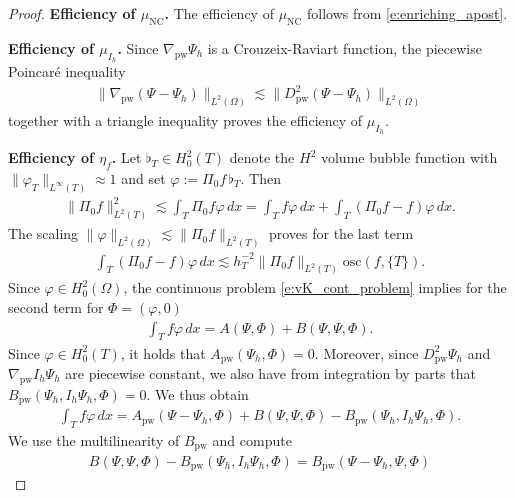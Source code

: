 \documentclass[a4paper]{amsart}
\theoremstyle{definition}
\numberwithin{equation}{section}
\numberwithin{theorem}{section}
\newcommand{\pw}{\mathrm{pw}}
\newcommand{\nc}{\mathrm{NC}}
\newcommand{\osc}{\mathrm{osc}}
\begin{document}
    
\begin{proof}
    \textbf{Efficiency of $\mu_\nc$.}
    The efficiency of $\mu_\nc$ follows from \eqref{e:enriching_apost}.
    
    \textbf{Efficiency of $\mu_{I_h}$.}
    Since $\nabla_\pw\Psi_h$ is a Crouzeix-Raviart function,
    the piecewise Poincar\'e inequality \cite{Brenner2003}
    \begin{align*}
        \lVert \nabla_\pw(\Psi-\Psi_h)\rVert_{L^2(\Omega)}
        \lesssim \lVert D^2_\pw(\Psi-\Psi_h)\rVert_{L^2(\Omega)}
    \end{align*}
    together with a triangle inequality proves the efficiency 
    of $\mu_{I_h}$.
    
    \textbf{Efficiency of $\eta_f$.}
    Let $\flat_T\in H^2_0(T)$ denote the $H^2$ volume bubble function
    with $\|\varphi_T\|_{L^\infty(T)}\approx1$
    and set $\varphi:=\Pi_0 f \,\flat_T$.
    Then 
    \begin{align*}
        \lVert \Pi_0 f\rVert_{L^2(T)}^2
        \lesssim \int_T \Pi_0 f \varphi\,dx 
        = \int_T f \varphi\,dx + \int_T (\Pi_0 f - f) \varphi\,dx.
    \end{align*}
    The scaling $\lVert\varphi\rVert_{L^2(\Omega)}\lesssim \lVert\Pi_0 f\rVert_{L^2(T)}$
    proves for the last term 
    \begin{align*}
        \int_T (\Pi_0 f - f) \varphi\,dx \lesssim h_T^{-2}  \lVert\Pi_0 f\rVert_{L^2(T)} \osc(f,\{T\}).
    \end{align*}
    Since $\varphi\in H^2_0(\Omega)$, the continuous problem
    \eqref{e:vK_cont_problem} implies for the second term
    for $\Phi=(\varphi,0)$
    \begin{align*}
        \int_T f \varphi\,dx
        = A(\Psi,\Phi) + B(\Psi,\Psi,\Phi).
    \end{align*}
    Since $\varphi\in H^2_0(T)$, it holds that $A_\pw(\Psi_h,\Phi)=0$.
    Moreover, since $D^2_\pw \Psi_h$ and $\nabla_\pw I_h\Psi_h$ are
    piecewise constant, we also have from integration by parts that
    $B_\pw(\Psi_h,I_h\Psi_h,\Phi)=0$. We thus obtain
    \begin{align*}
        \int_T f \varphi\,dx
        = A_\pw(\Psi-\Psi_h,\Phi) 
        + B(\Psi,\Psi,\Phi)
        - B_\pw(\Psi_h,I_h\Psi_h,\Phi)
        .
    \end{align*}
    We use the multilinearity of $B_\pw$ and compute
    \begin{align*}
        B(\Psi,\Psi,\Phi)
           - B_\pw(\Psi_h,I_h\Psi_h,\Phi)
        =B_\pw(\Psi-\Psi_h,\Psi,\Phi)

\end{align*}
\end{proof}
\end{document}
